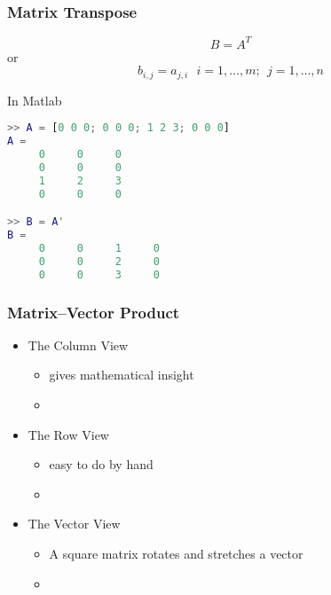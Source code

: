 \documentclass[10pt]{beamer}
\begin{document}
\begin{frame}[fragile]
\frametitle{Matrix Transpose}

\begin{equation*}
    B = A^T
\end{equation*}
or
\begin{equation*}
    b_{i,j} = a_{j,i}\ \ \ i = 1,\ldots,m;\ \ j = 1,\ldots, n
\end{equation*}

In Matlab\
\begin{lstlisting}[language=matlab]
>> A = [0 0 0; 0 0 0; 1 2 3; 0 0 0]
A =
	 0     0     0
	 0     0     0
	 1     2     3
	 0     0     0

>> B = A'
B =
	 0     0     1     0
	 0     0     2     0
	 0     0     3     0
\end{lstlisting}

\end{frame}
\begin{frame}
\frametitle{Matrix--Vector Product}

\begin{itemize}
    \item   The Column View
        \begin{itemize}
           \item   gives mathematical insight
           \item[]    \vspace{2ex}
        \end{itemize}
    \item   The Row View
        \begin{itemize}
           \item   easy to do by hand
           \item[]    \vspace{2ex}
        \end{itemize}
    \item   The Vector View
        \begin{itemize}
           \item   A square matrix rotates and stretches a vector
           \item[]    \vspace{2ex}
        \end{itemize}
\end{itemize}

\end{frame}
\end{document}
